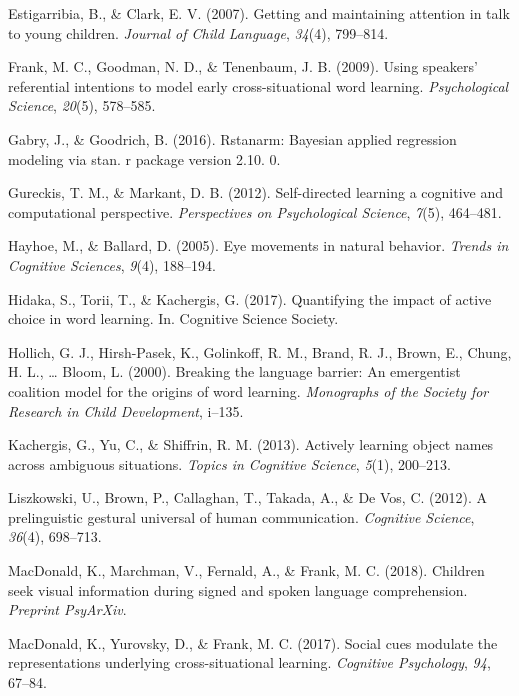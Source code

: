 \documentclass[man,floatsintext]{apa6}
\begin{document}
\hypertarget{ref-estigarribia2007getting}{}
Estigarribia, B., \& Clark, E. V. (2007). Getting and maintaining
attention in talk to young children. \emph{Journal of Child Language},
\emph{34}(4), 799--814.

\hypertarget{ref-frank2009using}{}
Frank, M. C., Goodman, N. D., \& Tenenbaum, J. B. (2009). Using
speakers' referential intentions to model early cross-situational word
learning. \emph{Psychological Science}, \emph{20}(5), 578--585.

\hypertarget{ref-gabry2016rstanarm}{}
Gabry, J., \& Goodrich, B. (2016). Rstanarm: Bayesian applied regression
modeling via stan. r package version 2.10. 0.

\hypertarget{ref-gureckis2012self}{}
Gureckis, T. M., \& Markant, D. B. (2012). Self-directed learning a
cognitive and computational perspective. \emph{Perspectives on
Psychological Science}, \emph{7}(5), 464--481.

\hypertarget{ref-hayhoe2005eye}{}
Hayhoe, M., \& Ballard, D. (2005). Eye movements in natural behavior.
\emph{Trends in Cognitive Sciences}, \emph{9}(4), 188--194.

\hypertarget{ref-hidaka2017quantifying}{}
Hidaka, S., Torii, T., \& Kachergis, G. (2017). Quantifying the impact
of active choice in word learning. In. Cognitive Science Society.

\hypertarget{ref-hollich2000breaking}{}
Hollich, G. J., Hirsh-Pasek, K., Golinkoff, R. M., Brand, R. J., Brown,
E., Chung, H. L., \ldots{} Bloom, L. (2000). Breaking the language
barrier: An emergentist coalition model for the origins of word
learning. \emph{Monographs of the Society for Research in Child
Development}, i--135.

\hypertarget{ref-kachergis2013actively}{}
Kachergis, G., Yu, C., \& Shiffrin, R. M. (2013). Actively learning
object names across ambiguous situations. \emph{Topics in Cognitive
Science}, \emph{5}(1), 200--213.

\hypertarget{ref-liszkowski2012prelinguistic}{}
Liszkowski, U., Brown, P., Callaghan, T., Takada, A., \& De Vos, C.
(2012). A prelinguistic gestural universal of human communication.
\emph{Cognitive Science}, \emph{36}(4), 698--713.

\hypertarget{ref-macdonald2018speed}{}
MacDonald, K., Marchman, V., Fernald, A., \& Frank, M. C. (2018).
Children seek visual information during signed and spoken language
comprehension. \emph{Preprint PsyArXiv}.

\hypertarget{ref-macdonald2017social}{}
MacDonald, K., Yurovsky, D., \& Frank, M. C. (2017). Social cues
modulate the representations underlying cross-situational learning.
\emph{Cognitive Psychology}, \emph{94}, 67--84.
\end{document}

